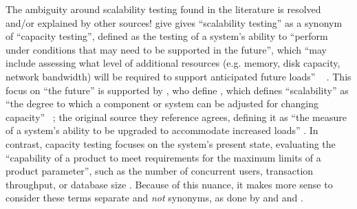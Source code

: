 The ambiguity around scalability testing found in the literature is resolved
and/or explained by other sources! \ifnotpaper \citeauthor{IEEE2021} give
\else \cite[p.~39]{IEEE2021} gives \fi ``scalability testing'' as a synonym
of ``capacity testing'', defined
as the testing of a system's ability to ``perform under conditions that may
need to be supported in the future'', which ``may include assessing what level
of additional resources (e.g. memory, disk capacity, network bandwidth) will
be required to support anticipated future loads''%
\ifnotpaper \ \citeyearpar[p.~39]{IEEE2021}%
\fi. This focus on ``the future'' is supported by
\ifnotpaper \citeauthor{ISTQB_author}, who define
\else \cite{ISTQB}, which defines
\fi ``scalability'' as ``the degree to which a component or system can be
adjusted for changing capacity''%
\ifnotpaper \ \citeyearpar{ISTQB}; the original source
      they reference agrees, defining it as ``the measure of a system's ability to be
      upgraded to accommodate increased loads'' \citep[p.~381]{GerrardAndThompson2002}%
\fi. In contrast, capacity testing focuses on the system's present state, evaluating
the ``capability of a product to meet requirements for the maximum limits of a
product parameter'', such as the number of concurrent users, transaction
throughput, or database size \citep{ISO_IEC2023a}. Because of this nuance, it
makes more sense to consider these terms separate and \emph{not} synonyms, as
done by
\ifnotpaper \citet[p.~53]{Firesmith2015} and \citet[pp.~22-23]{Bas2024}%
\else \cite[p.~53]{Firesmith2015} and \cite[pp.~22-23]{Bas2024}%
\fi.

